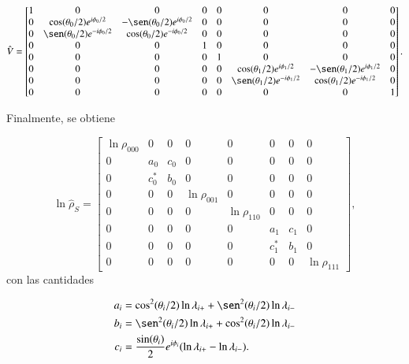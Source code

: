 \begin{appendixs}
\begin{equation*}
    \hat{V} = 
    \begin{bmatrix}
        1 & 0 & 0 & 0 & 0 & 0 & 0 & 0 \\
        0 & \cos(\theta_{0}/2)e^{i\phi_{0}/2} & -\sen(\theta_{0}/2)e^{i\phi_{0}/2} & 0 & 0 & 0 & 0 & 0 \\
        0 & \sen(\theta_{0}/2)e^{-i\phi_{0}/2} & \cos(\theta_{0}/2)e^{-i\phi_{0}/2} & 0 & 0 & 0 & 0 & 0 \\
        0 & 0 & 0 & 1 & 0 & 0 & 0 & 0 \\
        0 & 0 & 0 & 0 & 1 & 0 & 0 & 0 \\
        0 & 0 & 0 & 0 & 0 &  \cos(\theta_{1}/2)e^{i\phi_{1}/2} & -\sen(\theta_{1}/2)e^{i\phi_{1}/2} & 0 \\
        0 & 0 & 0 & 0 & 0 & \sen(\theta_{1}/2)e^{-i\phi_{1}/2} & \cos(\theta_{1}/2)e^{-i\phi_{1}/2} & 0 \\
        0 & 0 & 0 & 0 & 0 & 0 & 0 & 1 
        \end{bmatrix}.
\end{equation*}

Finalmente, se obtiene

\begin{equation*}
    \ln \hat{\rho}_{S} = 
    \begin{bmatrix}
        \ln \rho_{000} & 0 & 0 & 0 & 0 & 0 & 0 & 0 \\
        0 & a_{0} & c_{0} & 0 & 0 & 0 & 0 & 0 \\
        0 & c^{*}_{0} & b_{0} & 0 & 0 & 0 & 0 & 0 \\
        0 & 0 & 0 & \ln \rho_{001} & 0 & 0 & 0 & 0 \\
        0 & 0 & 0 & 0 & \ln \rho_{110} & 0 & 0 & 0 \\
        0 & 0 & 0 & 0 & 0 & a_{1} & c_{1} & 0 \\
        0 & 0 & 0 & 0 & 0 & c^{*}_{1} & b_{1} & 0 \\
        0 & 0 & 0 & 0 & 0 & 0 & 0 & \ln \rho_{111} 
        \end{bmatrix},
\end{equation*}
con las cantidades 

\begin{align*}
    a_{i} & = \cos^{2}(\theta_{i}/2) \ln \lambda_{i+} + \sen^{2}(\theta_{i}/2) \ln \lambda_{i-} \\
    b_{i} & = \sen^{2}(\theta_{i}/2) \ln \lambda_{i+} + \cos^{2}(\theta_{i}/2) \ln \lambda_{i-}  \\
    c_{i} & = \frac{\sin(\theta_{i})}{2}e^{i\phi_{i}} (\ln \lambda_{i+} - \ln \lambda_{i-}).    
\end{align*}


\end{appendixs}
